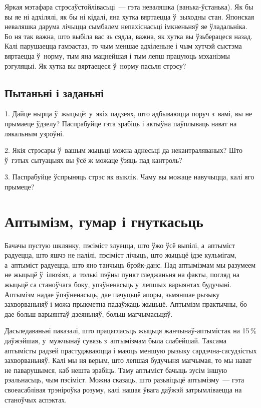 Яркая мэтафара стрэсаўстойлівасьці~--- гэта неваляшка (ванька-ўстанька). Як бы вы яе ні адхілялі, як бы ні кідалі, яна хутка вяртаецца ў~зыходны стан. Японская неваляшка дарума лічыцца сымбалем непахіснасьці імкненьняў яе ўладальніка. Бо ня так важна, што выбіла вас зь сядла, важна, як хутка вы ўзьберацеся назад. Калі парушаецца гамэастаз, то чым меншае адхіленьне і чым хутчэй сыстэма вяртаецца ў~норму, тым яна мацнейшая і тым лепш працуюць мэханізмы рэгуляцыі. Як хутка вы вяртаецеся ў~норму пасьля стрэсу?

\subsection*{Пытаньні і заданьні}

1. Дайце нырца ў~жыцьцё: у~якіх падзеях, што адбываюцца поруч з~вамі, вы не прымаеце ўдзелу? Паспрабуйце гэта зрабіць і актыўна паўплываць нават на лякальным узроўні.

2. Якія стрэсары ў~вашым жыцьці можна аднесьці да некантраляваных? Што ў~гэтых сытуацыях вы ўсё ж можаце ўзяць пад кантроль?

3. Паспрабуйце ўспрыняць стрэс як выклік. Чаму вы можаце навучыцца, калі яго прымеце?


\section{Аптымізм, гумар і гнуткасьць}

Бачачы пустую шклянку, пэсіміст злуецца, што ўжо ўсё выпілі, а~аптыміст радуецца, што яшчэ не налілі, пэсіміст лічыць, што жыцьцё ідзе кульмігам, а~аптыміст радуецца, што яно танчыць брэйк-данс. Пад аптымізмам мы разумеем не жыцьцё ў~ілюзіях, а~толькі пэўны пункт гледжаньня на факты, погляд на жыцьцё са станоўчага боку, упэўненасьць у~лепшых варыянтах будучыні. Аптымізм надае ўпэўненасьць, дае пачуцьцё апоры, зьмяншае рызыку захворваньняў і можа прыкметна падаўжаць жыцьцё. Аптымізм практычны, бо дае больш варыянтаў дзеяньняў, больш магчымасьцяў.

Дасьледаваньні паказалі, што працягласьць жыцьця жанчынаў-аптымістак на 15\,\% даўжэйшая, у~мужчынаў сувязь з~аптымізмам была слабейшай. Таксама аптымісты радзей прастуджваюцца і маюць меншую рызыку сардэчна-сасудзістых захворваньняў. Калі мы ня верым, што лепшая будучыня магчымая, то мы нават не паварушымся, каб нешта зрабіць. Таму аптыміст бачыць зусім іншую рэальнасьць, чым пэсіміст. Можна сказаць, што разьвіцьцё аптымізму~--- гэта своеасаблівая трэніроўка розуму, калі нашая ўвага даўжэй затрымліваецца на станоўчых аспэктах. 

